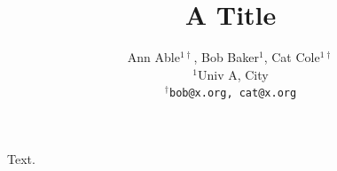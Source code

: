 \documentclass{article}
\begin{document}
\title{A Title}
\author{Ann Able$^{1\dagger}$, Bob Baker$^{1}$, Cat Cole$^{1\dagger}$ \\
$^1$Univ A, City \\
$^\dagger$\texttt{bob@x.org, cat@x.org}}
\maketitle
Text.
\end{document}
